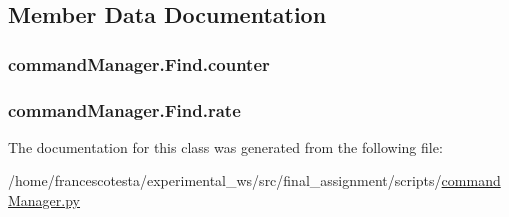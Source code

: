 \subsection{Member Data Documentation}
\subsubsection[{\texorpdfstring{counter}{counter}}]{\setlength{\rightskip}{0pt plus 5cm}command\+Manager.\+Find.\+counter}\hypertarget{classcommandManager_1_1Find_a75755e326232226bbd46786c7c889473}{}\label{classcommandManager_1_1Find_a75755e326232226bbd46786c7c889473}
\subsubsection[{\texorpdfstring{rate}{rate}}]{\setlength{\rightskip}{0pt plus 5cm}command\+Manager.\+Find.\+rate\hspace{0.3cm}{\ttfamily [static]}}\hypertarget{classcommandManager_1_1Find_a9c7870d56b1d25a57af7840fb2967f99}{}\label{classcommandManager_1_1Find_a9c7870d56b1d25a57af7840fb2967f99}


The documentation for this class was generated from the following file\+:\begin{DoxyCompactItemize}
\item 
/home/francescotesta/experimental\+\_\+ws/src/final\+\_\+assignment/scripts/\hyperlink{commandManager_8py}{command\+Manager.\+py}\end{DoxyCompactItemize}
